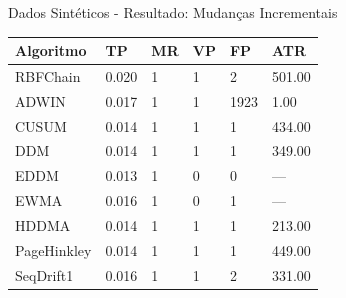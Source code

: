 \documentclass[10pt]{beamer}
\begin{document}
\begin{frame}{Dados Sintéticos - Resultado: Mudanças Incrementais}
    \begin{table}[ht]
        \centering
        \begin{tabular}{llllll}

        \toprule
        Algoritmo              & TP                     & MR                     & VP                     & FP                     & ATR                    \\
        \midrule
        RBFChain               & 0.020                  & 1                      & 1                      & 2                      & 501.00                 \\
        ADWIN                  & 0.017                  & 1                      & 1                      & 1923                   & 1.00                   \\
        CUSUM                  & 0.014                  & 1                      & 1                      & 1                      & 434.00                 \\
        DDM                    & 0.014                  & 1                      & 1                      & 1                      & 349.00                 \\
        EDDM                   & 0.013                  & 1                      & 0                      & 0                      & ---                    \\
        EWMA                   & 0.016                  & 1                      & 0                      & 1                      & ---                    \\
        HDDMA                  & 0.014                  & 1                      & 1                      & 1                      & 213.00                    \\
        PageHinkley            & 0.014                  & 1                      & 1                      & 1                      & 449.00                 \\
        SeqDrift1              & 0.016                  & 1                      & 1                      & 2                      & 331.00                 \\
        \bottomrule

        \end{tabular}
        \end{table}
\end{frame}
\end{document}

